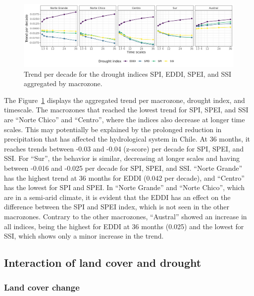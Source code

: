 \documentclass[
  authoryear,
  preprint,
  3p,
  onecolumn]{elsarticle}
\begin{document}
\elandscape

\begin{figure}[!ht]

{\centering \includegraphics{../output/figs/trend_macrozone_drought_indices.png}

}

\caption{\label{fig-trendDIMacro}Trend per decade for the drought
indices SPI, EDDI, SPEI, and SSI aggregated by macrozone.}

\end{figure}

The Figure~\ref{fig-trendDIMacro} displays the aggregated trend per
macrozone, drought index, and timescale. The macrozones that reached the
lowest trend for SPI, SPEI, and SSI are ``Norte Chico'' and ``Centro'',
where the indices also decrease at longer time scales. This may
potentially be explained by the prolonged reduction in precipitation
that has affected the hydrological system in Chile. At 36 months, it
reaches trends between -0.03 and -0.04 (z-score) per decade for SPI,
SPEI, and SSI. For ``Sur'', the behavior is similar, decreasing at
longer scales and having between -0.016 and -0.025 per decade for SPI,
SPEI, and SSI. ``Norte Grande'' has the highest trend at 36 months for
EDDI (0.042 per decade), and ``Centro'' has the lowest for SPI and SPEI.
In ``Norte Grande'' and ``Norte Chico'', which are in a semi-arid
climate, it is evident that the EDDI has an effect on the difference
between the SPI and SPEI index, which is not seen in the other
macrozones. Contrary to the other macrozones, ``Austral'' showed an
increase in all indices, being the highest for EDDI at 36 months (0.025)
and the lowest for SSI, which shows only a minor increase in the trend.

\hypertarget{interaction-of-land-cover-and-drought-1}{%
\subsection{Interaction of land cover and
drought}\label{interaction-of-land-cover-and-drought-1}}

\hypertarget{land-cover-change-1}{%
\subsubsection{Land cover change}\label{land-cover-change-1}}
\end{document}
